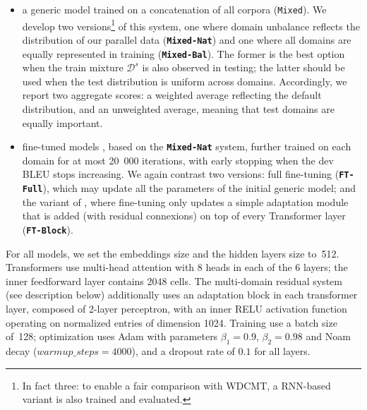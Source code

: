 \documentclass[11pt,a4paper]{article}
\newcommand{\fyDone}[1]{\done[FY]\Todo[FY:]{\textcolor{orange}{#1}}}
\newcommand{\jcDone}[1]{\done[JC]\Todo[JC:]{\textcolor{red}{#1}}}
\newcommand{\system}[1]{\texttt{\textbf{#1}}}
\begin{document}
\begin{itemize}
\item a generic model trained on a concatenation of all corpora (\texttt{Mixed}). We develop two versions\footnote{In fact three: to enable a fair comparison with WDCMT, a RNN-based variant is also trained and evaluated.} of this system, one where domain unbalance reflects the distribution of our parallel data (\system{Mixed-Nat}) and one where all domains are equally represented in training (\system{Mixed-Bal}). The former is the best option when the train mixture $\mathcal{D}^s$ is also observed in testing; the latter should be used when the test distribution is uniform across domains. Accordingly, we report two aggregate scores: a weighted average reflecting the default distribution, and an unweighted average, meaning that test domains are equally important.
\item fine-tuned models \cite{Luong15stanford,Freitag16fast}\jcDone{i would use Luong and Manning 2015}, based on the \system{Mixed-Nat} system, further trained on each domain for at most 20~000 iterations, with early stopping when the dev BLEU stops increasing. We again contrast two versions: full fine-tuning (\system{FT-Full}), which may update all the parameters of the initial generic model; and the variant of \cite{Bapna19simple}, where fine-tuning only updates a simple adaptation module that is added (with residual connexions) on top of every Transformer layer (\system{FT-Block}).
\end{itemize}

For all models, we set the embeddings size and the hidden layers size to~512. Transformers use multi-head attention with 8 heads in each of the 6 layers; the inner feedforward layer contains 2048 cells. The multi-domain residual system (see description below) additionally uses an adaptation block in each transformer layer, composed of 2-layer perceptron, with an inner RELU activation function operating on normalized entries of dimension 1024.
Training use a batch size of~128; optimization uses Adam with parameters $\beta_1=0.9$, $\beta_2= 0.98$ and Noam decay ($warmup\_steps=4000$), and a dropout rate of $0.1$ for all layers.\fyDone{Describe the block adaptation layer - voir slides} 
\end{document}
